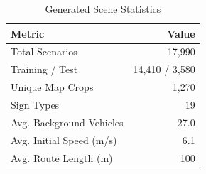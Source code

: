
\begin{table}[t]
\centering
\caption{Generated Scene Statistics}
\label{tab:scene_stats}
\begin{tabular}{lr}
\toprule
\textbf{Metric} & \textbf{Value} \\
\midrule
Total Scenarios & 17,990 \\
Training / Test & 14,410 / 3,580 \\
Unique Map Crops & 1,270 \\
Sign Types & 19 \\
\midrule
Avg. Background Vehicles & 27.0 \\
Avg. Initial Speed (m/s) & 6.1 \\
Avg. Route Length (m) & 100 \\
\bottomrule
\end{tabular}
\end{table}
